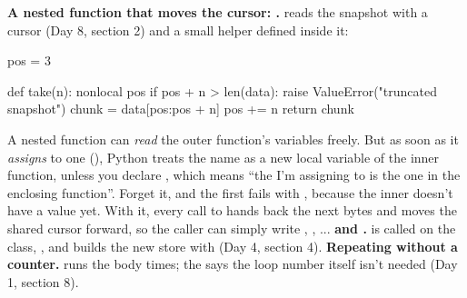 \documentclass[10pt,a4paper]{article}
\begin{document}
\textbf{A nested function that moves the cursor: .}  reads the snapshot with a cursor  (Day 8, section 2) and a small helper defined inside it:
\begin{pycode}
pos = 3

def take(n):
    nonlocal pos
    if pos + n > len(data):
        raise ValueError("truncated snapshot")
    chunk = data[pos:pos + n]
    pos += n
    return chunk
\end{pycode}
A nested function can \emph{read} the outer function’s variables freely. But as soon as it \emph{assigns} to one (), Python treats the name as a new local variable of the inner function, unless you declare , which means “the  I’m assigning to is the one in the enclosing function”. Forget it, and the first  fails with , because the inner  doesn’t have a value yet. With it, every call to  hands back the next  bytes and moves the shared cursor forward, so the caller can simply write , , ...
\textbf{ and .}  is called on the class, , and builds the new store with  (Day 4, section 4).
\textbf{Repeating without a counter.}  runs the body  times; the \code{\_} says the loop number itself isn’t needed (Day 1, section 8).
\end{document}
